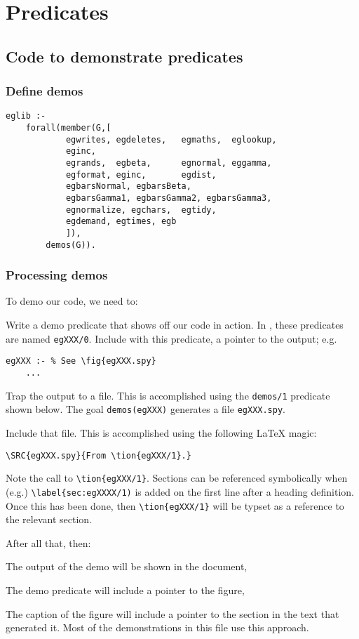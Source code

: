 \section{ Predicates
}
\subsection{ Code to demonstrate predicates
}
\subsubsection{ Define demos }\begin{Verbatim}
eglib :- 
    forall(member(G,[
            egwrites, egdeletes,   egmaths,  eglookup,
            eginc, 
            egrands,  egbeta,      egnormal, eggamma,
            egformat, eginc,       egdist, 
            egbarsNormal, egbarsBeta,
            egbarsGamma1, egbarsGamma2, egbarsGamma3,
            egnormalize, egchars,  egtidy,
            egdemand, egtimes, egb
            ]),
        demos(G)).
\end{Verbatim}
\subsubsection{ Processing demos
}
 To demo our code, we need to:
\bi
\item Write a demo predicate that shows off our code in action.
 In {\PROD}, these predicates are named  {\tt egXXX/0}. 
 Include with this predicate, 
 a pointer to the output; e.g.
\begin{verbatim}
egXXX :- % See \fig{egXXX.spy}
    ... 
\end{verbatim}
\item Trap the output to a file. This is accomplished using
the {\tt demos/1} predicate shown below. The goal
{\tt demos(egXXX)} generates a file {\tt egXXX.spy}. 
\item Include that file. This is accomplished using
the following {\LaTeX} magic:
\begin{verbatim}
\SRC{egXXX.spy}{From \tion{egXXX/1}.}
\end{verbatim}
\ei
Note the call to \verb+\tion{egXXX/1}+.
Sections can be referenced
symbolically 
when (e.g.) \verb+\label{sec:egXXXX/1)+
is added on the first line after a heading definition.
Once this has been done, then \verb+\tion{egXXX/1}+ will
be typset as a reference to the relevant section.

After all that, then:
\bi
\item The output of the demo will be shown in the document,
\item
The demo predicate will include a pointer to the figure,
\item
The caption of the figure will include a pointer to the section
in the text that generated it. 
\ei
Most of the demonstrations in this file use this approach.

